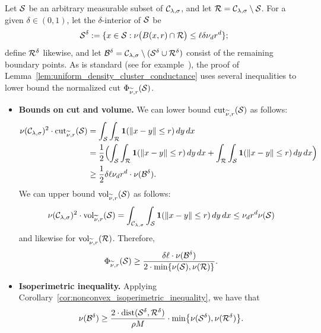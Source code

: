 	Let $\mathcal{S}$ be an arbitrary measurable subset of $\mathcal{C}_{\lambda,\sigma}$, and let $\mathcal{R} = \mathcal{C}_{\lambda,\sigma} \setminus \mathcal{S}$. For a given $\delta \in (0,1)$, let the $\delta$-interior of $\mathcal{S}$ be 
	\begin{equation*}
	\mathcal{S}^{\delta} := \{x \in \mathcal{S}: \nu\bigl(B(x,r) \cap \mathcal{R}\bigr) \leq \ell \delta \nu_d r^d\};
	\end{equation*}
	define $\mathcal{R}^{\delta}$ likewise, and let $\mathcal{B}^{\delta} = \mathcal{C}_{\lambda,\sigma} \setminus (\mathcal{S}^{\delta} \cup \mathcal{R}^{\delta})$ consist of the remaining boundary points.
	As is standard (see for example~\cite{dyer1991,lovasz1990}), the proof of Lemma~\ref{lem:uniform_density_cluster_conductance} uses several inequalities to lower bound the normalized cut $\Phi_{\widetilde{\nu},r}(\mathcal{S})$.
	\begin{itemize}
		\item \textbf{Bounds on cut and volume.}
		We can lower bound $\mathrm{cut}_{\widetilde{\nu},r}(\mathcal{S})$ as follows:
		\begin{align*}
		\nu(\mathcal{C}_{\lambda,\sigma})^2 \cdot \mathrm{cut}_{\widetilde{\nu},r}(\mathcal{S}) & = \int_{\mathcal{S}} \int_{\mathcal{R}} \mathbf{1}(\|x - y\| \leq r) \,dy \,dx \\
		& = \frac{1}{2}\Bigl(\int_{\mathcal{S}} \int_{\mathcal{R}} \mathbf{1}(\|x - y\| \leq r) \,dy \,dx + \int_{\mathcal{R}} \int_{\mathcal{S}} \mathbf{1}(\|x - y\| \leq r) \,dy \,dx\Bigr) \\
		& \geq \frac{1}{2} \delta \ell \nu_d r^d \cdot \nu(\mathcal{B}^{\delta}).
		\end{align*}
		We can upper bound $\mathrm{vol}_{\widetilde{\nu},r}(\mathcal{S})$ as follows:
		\begin{equation*}
		\nu(\mathcal{C}_{\lambda,\sigma})^2 \cdot \mathrm{vol}_{\widetilde{\nu},r}(\mathcal{S}) = \int_{\mathcal{C}_{\lambda,\sigma}} \int_{\mathcal{S}} \mathbf{1}(\|x - y\| \leq r) \,dy \,dx \leq \nu_d r^d \nu(\mathcal{S})
		\end{equation*}
		and likewise for $\mathrm{vol}_{\widetilde{\nu},r}(\mathcal{R})$. Therefore,
		\begin{equation}
		\label{pf:uniform_density_cluster_conductance_1}
		\Phi_{\widetilde{\nu},r}(\mathcal{S}) \geq \frac{\delta \ell \cdot \nu(\mathcal{B}^{\delta})}{2 \cdot \min\{\nu(\mathcal{S}), \nu(\mathcal{R})\}}.
		\end{equation}
		\item \textbf{Isoperimetric inequality.}
		Applying Corollary~\ref{cor:nonconvex_isoperimetric_inequality}, we have that
		\begin{equation}
		\label{pf:uniform_density_cluster_conductance_2}
		\nu(\mc{B}^{\delta}) \geq \frac{2 \cdot \mathrm{dist}(\mc{S}^{\delta},\mc{R}^{\delta})}{\rho M} \cdot \min\bigl\{\nu(\mc{S}^{\delta}),\nu(\mc{R}^{\delta})\bigr\}.

\end{equation}
\end{itemize}
